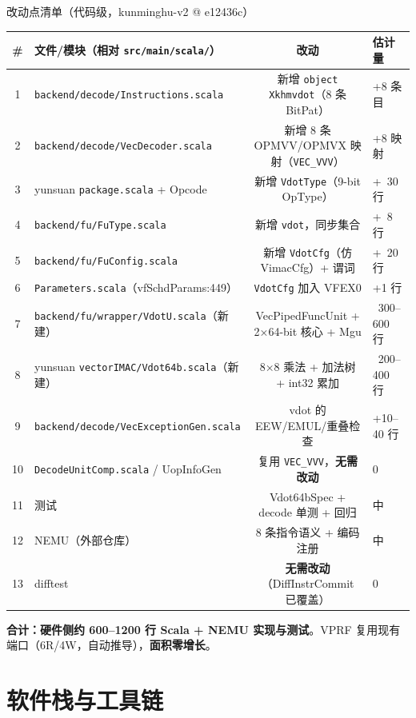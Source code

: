 \documentclass[aspectratio=169]{beamer}
\newcommand{\smalltable}[1]{\par\centering\scriptsize #1\par}
\begin{document}
\begin{frame}{改动点清单（代码级，kunminghu-v2 @ e12436c）}
\smalltable{%
\begin{tabular}{@{}cp{6.4cm}cl@{}}
\toprule
\# & 文件/模块（相对 \texttt{src/main/scala/}） & 改动 & 估计量 \\
\midrule
1 & \texttt{backend/decode/Instructions.scala} & 新增 \texttt{object Xkhmvdot}（8 条 BitPat） & +8 条目 \\
2 & \texttt{backend/decode/VecDecoder.scala} & 新增 8 条 OPMVV/OPMVX 映射（\texttt{VEC\_VVV}） & +8 映射 \\
3 & yunsuan \texttt{package.scala} + Opcode & 新增 \texttt{VdotType}（9-bit OpType） & +~30 行 \\
4 & \texttt{backend/fu/FuType.scala} & 新增 \texttt{vdot}，同步集合 & +~8 行 \\
5 & \texttt{backend/fu/FuConfig.scala} & 新增 \texttt{VdotCfg}（仿 VimacCfg）+ 谓词 & +~20 行 \\
6 & \texttt{Parameters.scala}（vfSchdParams:449） & \texttt{VdotCfg} 加入 VFEX0 & +1 行 \\
7 & \texttt{backend/fu/wrapper/VdotU.scala}（新建） & VecPipedFuncUnit + 2×64-bit 核心 + Mgu & ~300–600 行 \\
8 & yunsuan \texttt{vectorIMAC/Vdot64b.scala}（新建） & 8×8 乘法 + 加法树 + int32 累加 & ~200–400 行 \\
9 & \texttt{backend/decode/VecExceptionGen.scala} & vdot 的 EEW/EMUL/重叠检查 & +10–40 行 \\
10 & \texttt{DecodeUnitComp.scala} / UopInfoGen & 复用 \texttt{VEC\_VVV}，\textbf{无需改动} & 0 \\
11 & 测试 & Vdot64bSpec + decode 单测 + 回归 & 中 \\
12 & NEMU（外部仓库） & 8 条指令语义 + 编码注册 & 中 \\
13 & difftest & \textbf{无需改动}（DiffInstrCommit 已覆盖） & 0 \\
\bottomrule
\end{tabular}}
\vspace{0.4em}
\textbf{合计：硬件侧约 600–1200 行 Scala + NEMU 实现与测试}。VPRF 复用现有端口（6R/4W，自动推导），\textbf{面积零增长}。
\end{frame}

\section{软件栈与工具链}
\end{document}
